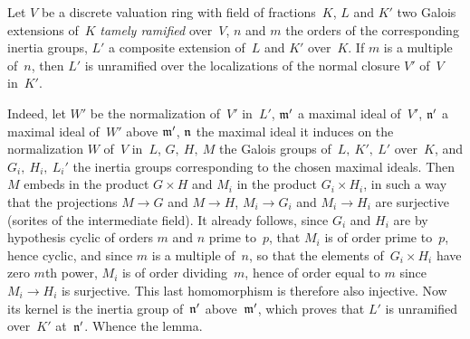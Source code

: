\begin{lemma}
\label{X.3.6}
Let $V$ be a discrete valuation ring with
field of fractions~$K$, $L$ and $K'$ two Galois extensions
of~$K$ \emph{tamely ramified} over~$V$, $n$ and $m$ the
orders of the
corresponding inertia groups,
$L'$ a composite extension
of~$L$ and $K'$ over~$K$. If $m$ is a multiple of~$n$,
then $L'$ is unramified over the localizations of the
normal closure $V'$ of~$V$ in~$K'$.
\end{lemma}

Indeed, let $W'$ be the normalization of~$V'$ in~$L'$, $\mathfrak{m'}$
a maximal ideal of~$V'$, $\mathfrak{n'}$ a maximal ideal of~$W'$
above
$\mathfrak{m'}$,
$\mathfrak{n}$ the maximal ideal it induces on the normalization $W$
of~$V$ in~$L$, $G,\ H,\ M$ the Galois groups of~$L,\ K',\ L'$
over~$K$, and $G_i,\ H_i,\ L_i'$ the inertia groups corresponding to the
chosen maximal ideals. Then $M$ embeds in the product
$G\times H$ and $M_i$ in the product $G_i\times H_i$, in such a way that the projections $M\to G$ and $M\to H$, $M_i\to G_i$
and $M_i\to H_i$ are surjective (sorites of the intermediate
field). It already follows, since $G_i$ and
$H_i$ are by hypothesis cyclic of orders $m$ and $n$ prime
to~$p$, that $M_i$ is of order prime to~$p$, hence cyclic, and
since $m$ is a multiple of~$n$, so that the elements of~$G_i\times
H_i$ have zero
$m$th power, $M_i$ is of order
dividing~$m$, hence of order equal to $m$ since $M_i\to H_i$ is
surjective. This last homomorphism is therefore also
injective. Now its kernel is the inertia group of~$\mathfrak{n'}$
above~$\mathfrak{m'}$, which proves that $L'$ is unramified
over~$K'$ at~$\mathfrak{n'}$. Whence the lemma.

